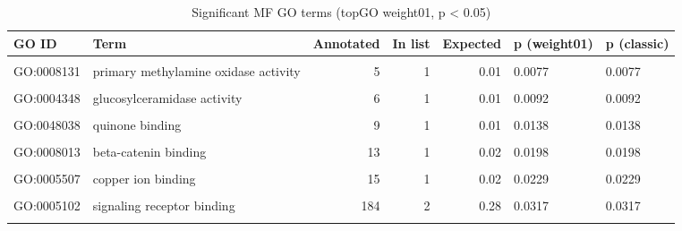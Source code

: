 \documentclass[
  11pt,
]{article}
\newcounter{none} %
\begin{document}
\begin{longtable}[t]{l>{\raggedright\arraybackslash}p{7cm}rrrll}
\caption{\label{tab:mf-table}Significant MF GO terms (topGO weight01, p < 0.05)}\\
\toprule
GO ID & Term & Annotated & In list & Expected & p (weight01) & p (classic)\\
\midrule
\cellcolor{gray!10}{GO:0045159} & \cellcolor{gray!10}{myosin II binding} & \cellcolor{gray!10}{4} & \cellcolor{gray!10}{1} & \cellcolor{gray!10}{0.01} & \cellcolor{gray!10}{0.0061} & \cellcolor{gray!10}{0.0061}\\
GO:0008131 & primary methylamine oxidase activity & 5 & 1 & 0.01 & 0.0077 & 0.0077\\
\cellcolor{gray!10}{GO:0005247} & \cellcolor{gray!10}{voltage-gated chloride channel activity} & \cellcolor{gray!10}{5} & \cellcolor{gray!10}{1} & \cellcolor{gray!10}{0.01} & \cellcolor{gray!10}{0.0077} & \cellcolor{gray!10}{0.0077}\\
GO:0004348 & glucosylceramidase activity & 6 & 1 & 0.01 & 0.0092 & 0.0092\\
\cellcolor{gray!10}{GO:0008474} & \cellcolor{gray!10}{palmitoyl-(protein) hydrolase activity} & \cellcolor{gray!10}{8} & \cellcolor{gray!10}{1} & \cellcolor{gray!10}{0.01} & \cellcolor{gray!10}{0.0123} & \cellcolor{gray!10}{0.0123}\\
\addlinespace
GO:0048038 & quinone binding & 9 & 1 & 0.01 & 0.0138 & 0.0138\\
\cellcolor{gray!10}{GO:0004300} & \cellcolor{gray!10}{enoyl-CoA hydratase activity} & \cellcolor{gray!10}{9} & \cellcolor{gray!10}{1} & \cellcolor{gray!10}{0.01} & \cellcolor{gray!10}{0.0138} & \cellcolor{gray!10}{0.0138}\\
GO:0008013 & beta-catenin binding & 13 & 1 & 0.02 & 0.0198 & 0.0198\\
\cellcolor{gray!10}{GO:0004407} & \cellcolor{gray!10}{histone deacetylase activity} & \cellcolor{gray!10}{13} & \cellcolor{gray!10}{1} & \cellcolor{gray!10}{0.02} & \cellcolor{gray!10}{0.0198} & \cellcolor{gray!10}{0.0198}\\
GO:0005507 & copper ion binding & 15 & 1 & 0.02 & 0.0229 & 0.0229\\
\addlinespace
\cellcolor{gray!10}{GO:1990756} & \cellcolor{gray!10}{ubiquitin-like ligase-substrate adaptor ...} & \cellcolor{gray!10}{15} & \cellcolor{gray!10}{1} & \cellcolor{gray!10}{0.02} & \cellcolor{gray!10}{0.0229} & \cellcolor{gray!10}{0.0229}\\
GO:0005102 & signaling receptor binding & 184 & 2 & 0.28 & 0.0317 & 0.0317\\
\cellcolor{gray!10}{GO:0019905} & \cellcolor{gray!10}{syntaxin binding} & \cellcolor{gray!10}{25} & \cellcolor{gray!10}{1} & \cellcolor{gray!10}{0.04} & \cellcolor{gray!10}{0.0378} & \cellcolor{gray!10}{0.0378}\\
\bottomrule
\end{longtable}
\endgroup{}
\end{document}
